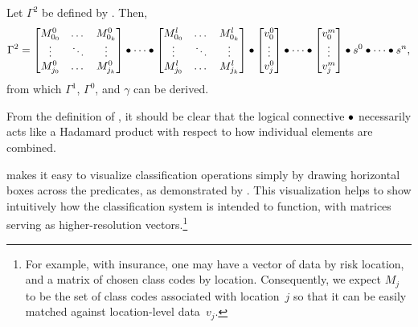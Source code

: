 \begin{axiom}
  Let $\Gamma^2$ be defined by .
  Then,
  \begin{equation*}
    \Gamma^2 =
    \begin{bmatrix} M^{0}_{0_0} & \dots & M^{0}_{0_k} \\ \vdots & \ddots & \vdots \\ M^{0}_{j_0} & \dots & M^{0}_{j_k} \\ \end{bmatrix}\bullet\cdots\bullet\begin{bmatrix} M^{l}_{0_0} & \dots & M^{l}_{0_k} \\ \vdots & \ddots & \vdots \\ M^{l}_{j_0} & \dots & M^{l}_{j_k} \\ \end{bmatrix}
    \bullet
    \begin{bmatrix} v^{0}_0 \\ \vdots \\ v^{0}_j \\ \end{bmatrix}\bullet\cdots\bullet\begin{bmatrix} v^{m}_0 \\ \vdots \\ v^{m}_j \\ \end{bmatrix}
    \bullet
    s^0\bullet\cdots\bullet s^n,
  \end{equation*}
  from which $\Gamma^1$, $\Gamma^0$, and $\gamma$ can be derived.
\end{axiom}

\begin{remark}
  From the definition of ,
    it should be clear that the logical connective $\bullet$ necessarily
    acts like a Hadamard product\cite{wp:hadamard-product} with respect to
    how individual elements are combined.
\end{remark}

 makes it easy to visualize classification
  operations simply by drawing horizontal boxes across the predicates,
    as demonstrated by .
This visualization helps to show intuitively how the classification system
  is intended to function,
    with matrices serving as higher-resolution vectors.\footnote{%
      For example,
        with insurance,
        one may have a vector of data by risk location,
          and a matrix of chosen class codes by location.
      Consequently,
        we expect $M_j$ to be the set of class codes associated with
        location~$j$ so that it can be easily matched against location-level
        data~$v_j$.}

